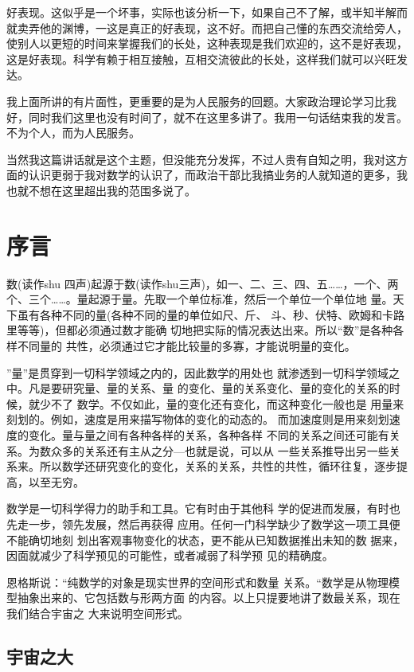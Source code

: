 \documentclass[twoside,openright,headings=optiontohead]{ctexbook} %
\begin{document}
{好表现。这似乎是一个坏事，实际也该分析一下，如果自己不了解，或半知半解而就卖弄他的渊博，一这是真正的好表现，这不好。而把自己懂的东西交流给旁人，使别人以更短的时间来掌握我们的长处，这种表现是我们欢迎的，这不是好表现，这是好表现。科学有赖于相互接触，互相交流彼此的长处，这样我们就可以兴旺发达。

我上面所讲的有片面性，更重要的是为人民服务的回题。大家政治理论学习比我好，同时我们这里也没有时间了，就不在这里多讲了。我用一句话结束我的发言。\\
不为个人，而为人民服务。

当然我这篇讲话就是这个主题，但没能充分发挥，不过人贵有自知之明，我对这方面的认识更弱于我对数学的认识了，而政治干部比我搞业务的人就知道的更多，我也就不想在这里超出我的范围多说了。

\chapter*{序言}\label{ux5e8fux8a00}

数(读作shu
四声)起源于数(读作shu三声)，如一、二、三、四、五\ldots{}\ldots{}，一个、两个、三个\ldots{}\ldots{}。量起源于量。先取一个单位标准，然后一个单位一个单位地
量。天下虽有各种不同的量(各种不同的量的单位如尺、斤、
斗、秒、伏特、欧姆和卡路里等等)，但都必须通过数才能确
切地把实际的情况表达出来。所以``数''是各种各样不同量的
共性，必须通过它才能比较量的多寡，才能说明量的变化。

''量''是贯穿到一切科学领域之内的，因此数学的用处也
就渗透到一切科学领域之中。凡是要研究量、量的关系、量
的变化、量的关系变化、量的变化的关系的时候，就少不了
数学。不仅如此，量的变化还有变化，而这种变化一般也是
用量来刻划的。例如，速度是用来描写物体的变化的动态的。
而加速度则是用来刻划速度的变化。量与量之间有各种各样的关系，各种各样
不同的关系之间还可能有关系。为数众多的关系还有主从之分---也就是说，可以从
一些关系推导出另一些关系来。所以数学还研究变化的变化，关系的关系，共性的共性，循环往复，逐步提高，以至无穷。

数学是一切科学得力的助手和工具。它有时由于其他科
学的促进而发展，有时也先走一步，领先发展，然后再获得
应用。任何一门科学缺少了数学这一项工具便不能确切地刻
划出客观事物变化的状态，更不能从已知数据推出未知的数
据来，因面就减少了科学预见的可能性，或者减弱了科学预 见的精确度。

恩格斯说：``纯数学的对象是现实世界的空间形式和数量
关系。``数学是从物理模型抽象出来的、它包括数与形两方面
的内容。以上只提要地讲了数最关系，现在我们结合宇宙之 大来说明空间形式。

\section{宇宙之大}\label{ux5b87ux5b99ux4e4bux5927}

}
\end{document}
